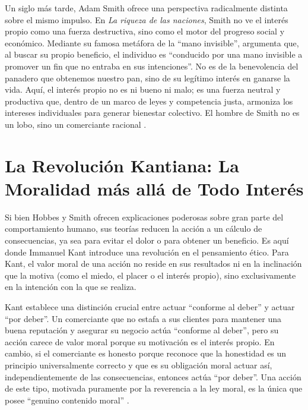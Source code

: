 \documentclass[12pt, a4paper]{article}
\begin{document}
Un siglo más tarde, Adam Smith ofrece una perspectiva radicalmente distinta sobre el mismo impulso. En \textit{La riqueza de las naciones}, Smith no ve el interés propio como una fuerza destructiva, sino como el motor del progreso social y económico. Mediante su famosa metáfora de la ``mano invisible'', argumenta que, al buscar su propio beneficio, el individuo es ``conducido por una mano invisible a promover un fin que no entraba en sus intenciones''. No es de la benevolencia del panadero que obtenemos nuestro pan, sino de su legítimo interés en ganarse la vida. Aquí, el interés propio no es ni bueno ni malo; es una fuerza neutral y productiva que, dentro de un marco de leyes y competencia justa, armoniza los intereses individuales para generar bienestar colectivo. El hombre de Smith no es un lobo, sino un comerciante racional \autocite{Smith1776}.

\section*{La Revolución Kantiana: La Moralidad más allá de Todo Interés}

Si bien Hobbes y Smith ofrecen explicaciones poderosas sobre gran parte del comportamiento humano, sus teorías reducen la acción a un cálculo de consecuencias, ya sea para evitar el dolor o para obtener un beneficio. Es aquí donde Immanuel Kant introduce una revolución en el pensamiento ético. Para Kant, el valor moral de una acción no reside en sus resultados ni en la inclinación que la motiva (como el miedo, el placer o el interés propio), sino exclusivamente en la intención con la que se realiza.

Kant establece una distinción crucial entre actuar ``conforme al deber'' y actuar ``por deber''. Un comerciante que no estafa a sus clientes para mantener una buena reputación y asegurar su negocio actúa ``conforme al deber'', pero su acción carece de valor moral porque su motivación es el interés propio. En cambio, si el comerciante es honesto porque reconoce que la honestidad es un principio universalmente correcto y que es su obligación moral actuar así, independientemente de las consecuencias, entonces actúa ``por deber''. Una acción de este tipo, motivada puramente por la reverencia a la ley moral, es la única que posee ``genuino contenido moral'' \autocite[p.~25]{Kant1785}.
\end{document}
